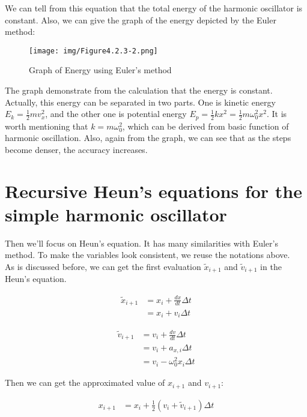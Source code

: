 \documentclass[12pt]{article}
\begin{document}
We can tell from this equation that the total energy of the harmonic oscillator is constant. Also, we can give the graph of the energy depicted by the Euler method: 

\begin{figure}[htb]
    \centering
    \texttt{[image: img/Figure4.2.3-2.png]}
    \caption{Graph of Energy using Euler's method}
\end{figure} 

The graph demonstrate from the calculation that the energy is constant. Actually, this energy can be separated in two parts. One is kinetic energy $E_k = \frac{1}{2}mv_x^2$, and the other one is potential energy $E_p = \frac{1}{2} k x^2 = \frac{1}{2} m \omega_0^2 x^2$. It is worth mentioning that $k = m \omega_0^2$, which can be derived from basic function of harmonic oscillation. Also, again from the graph, we can see that as the steps become denser, the accuracy increases. 



\section{Recursive Heun's equations for the simple harmonic
oscillator}

Then we'll focus on Heun's equation. It has many similarities with Euler's method. To make the variables look consistent, we reuse the notations above. \\

As is discussed before, we can get the first evaluation $\tilde{x}_{i+1}$ and $\tilde{v}_{i+1}$ in the Heun's equation. 

\begin{align}
    \tilde{x}_{i+1}  &= x_{i} + \frac{dx}{dt} \Delta t \\
                     &= x_{i} + v_{i} \Delta t \nonumber 
\end{align}

\begin{align}
    \tilde{v}_{i+1} &= v_{i} + \frac{dv}{dt} \Delta t \\
                    &= v_{i} + a_{x,i} \Delta t \nonumber \\
                    &= v_{i} - \omega_{0}^2 x_{i} \Delta t \nonumber 
\end{align}

Then we can get the approximated value of $x_{i+1}$ and $v_{i+1}$: 

\begin{align}
    x_{i+1} &= x_{i} + \frac{1}{2} (v_{i} + \tilde{v}_{i+1}) \Delta t
\end{align}
\end{document}
